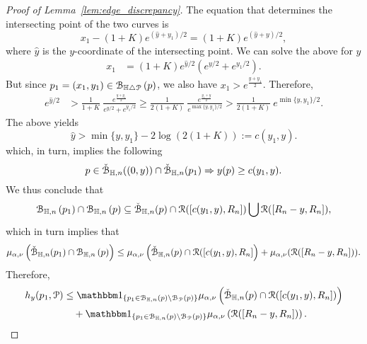 \begin{proof}[Proof of Lemma~\ref{lem:edge_discrepancy}]
The equation that determines the intersecting point of the two curves is
\[
	x_1 - (1+K)e^{(\hat{y} + y_1)/2}= (1+K) e^{(\hat{y} + y)/2},
\]
where $\hat{y}$ is the $y$-coordinate of the intersecting point. 
We can solve the above for $\hat{y}$  
\begin{equation*} 
\begin{split}
x_1 &=(1+K) e^{\hat{y}/2} \left( e^{y/2} + e^{y_1/2} \right).
\end{split}
\end{equation*}
But since $p_1=(x_1,y_1)  \in {\mathcal B}_{\mathbb{H} \bigtriangleup {\mathcal P}}\left(p\right)$, we also have $x_1 > e^{\frac{y + y_1}{2}}$. Therefore, 
\begin{equation*}
\begin{split}
 e^{\hat{y}/2}& > \frac{1}{1+K}~\frac{e^{\frac{y + y_1}{2}}}{ e^{y/2}+ e^{y_1/2}} \geq 
\frac{1}{2(1+K)}~\frac{e^{\frac{y_1 + y}{2}}}{ e^{\max \{y, y_1\} /2}} 
> \frac{1}{2(1 + K)} ~ e^{\min\{y, y_1\}/2}. 
 \end{split}
\end{equation*}
The above yields
\begin{equation} \label{eq:to_use_I}
\hat{y} > \min\{y, y_1\} - 2\log(2(1+K)) := c(y_1, y). 
\end{equation}
which, in turn, implies the following 
\begin{equation}\label{eq:intersex_approx}
	p \in \check{{\mathcal B}}_{\mathbb{H},n}((0,y))\cap \check{{\mathcal B}}_{\mathbb{H},n}(p_1) \Rightarrow y(p) \ge c(y_1,y).
\end{equation}
We thus conclude that 
\[ 
	{\mathcal B}_{\mathbb{H},n}\left(p_1\right) \cap {\mathcal B}_{\mathbb{H},n}\left(p\right) \subseteq \check{{\mathcal B}}_{\mathbb{H},n}(p) \cap {\mathcal R}([c(y_1,y), R_n]) 
	\bigcup {\mathcal R} ([R_n - y,R_n]),
\]
which in turn implies that
\[
	\mu_{\alpha,\nu} \left( \check{{\mathcal B}}_{\mathbb{H},n}(p_1) \cap {\mathcal B}_{\mathbb{H},n}\left(p\right) \right) \leq 
	\mu_{\alpha,\nu}\left( \check{{\mathcal B}}_{\mathbb{H},n}(p) \cap  {\mathcal R}([c(y_1,y), R_n]\right) + 
	\mu_{\alpha,\nu} ({\mathcal R} ([R_n - y, R_n]) ).
\]
Therefore, 
\begin{align} 
	h_y(p_1, \Pcal) &\leq \ind{p_1 \in \BallHyp{p}\setminus \BallPo{p}} 
    	\mu_{\alpha,\nu}  \left( \FatBallHyp{p} \cap  \Rcal([c(y_1,y), R_n])\right)
        \label{eq:h_upper_bound_1}\\
	&\hspace{10pt}+ \ind{p_1 \in \BallHyp{p}\setminus \BallPo{p}}
    	\mu_{\alpha,\nu}  \left( \Rcal ([R_n - y, R_n]) \right). \label{eq:h_upper_bound_2}
\end{align}


\end{proof}
